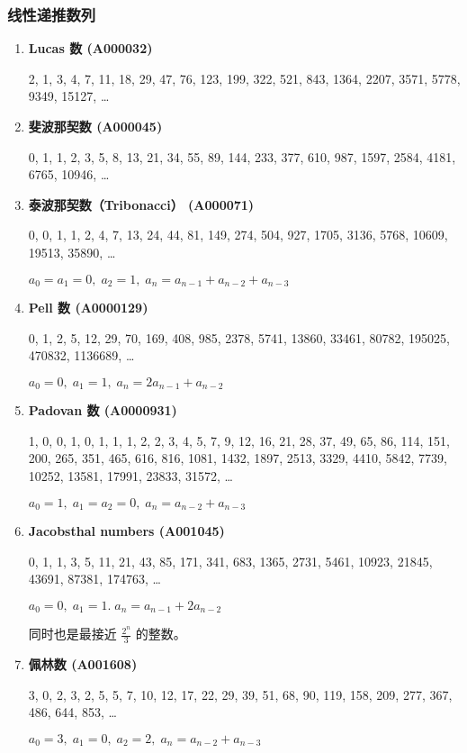 \documentclass[a4paper, twoside]{article}
\begin{document}
    \subsubsection{线性递推数列}

    \begin{enumerate}
    
        \item \textbf{Lucas 数 (A000032)}
        
        2, 1, 3, 4, 7, 11, 18, 29, 47, 76, 123, 199, 322, 521, 843, 1364, 2207, 3571, 5778, 9349, 15127, \dots
        
        \item \textbf{斐波那契数 (A000045)}
        
        0, 1, 1, 2, 3, 5, 8, 13, 21, 34, 55, 89, 144, 233, 377, 610, 987, 1597, 2584, 4181, 6765, 10946, \dots
        
        \item \textbf{泰波那契数（Tribonacci） (A000071)}
        
        0, 0, 1, 1, 2, 4, 7, 13, 24, 44, 81, 149, 274, 504, 927, 1705, 3136, 5768, 10609, 19513, 35890, \dots
        
        $ a_0 = a_1 = 0,\; a_2 = 1,\; a_n = a_{n - 1} + a_{n - 2} + a_{n - 3} $
        
        \item \textbf{Pell 数 (A0000129)}
        
        0, 1, 2, 5, 12, 29, 70, 169, 408, 985, 2378, 5741, 13860, 33461, 80782, 195025, 470832, 1136689, \dots
        
        $ a_0 = 0,\; a_1 = 1,\; a_n = 2a_{n - 1} + a_{n - 2} $
        
        \item \textbf{Padovan 数 (A0000931)}
        
        1, 0, 0, 1, 0, 1, 1, 1, 2, 2, 3, 4, 5, 7, 9, 12, 16, 21, 28, 37, 49, 65, 86, 114, 151, 200, 265, 351, 465, 616, 816, 1081, 1432, 1897, 2513, 3329, 4410, 5842, 7739, 10252, 13581,  17991,   23833, 31572, \dots
        
        $a_0 = 1,\; a_1 = a_2 = 0,\; a_n = a_{n - 2} + a_{n - 3}$
        
        \item \textbf{Jacobsthal numbers (A001045)}
        
        0, 1, 1, 3, 5, 11, 21, 43, 85, 171, 341, 683, 1365, 2731, 5461, 10923, 21845, 43691, 87381, 174763, \dots
        
        $ a_0 = 0,\; a_1 = 1.\; a_n = a_{n - 1} + 2a_{n - 2} $
        
        同时也是最接近 $\frac {2 ^ n} 3$ 的整数。
        
        \item \textbf{佩林数 (A001608)}
        
        3, 0, 2, 3, 2, 5, 5, 7, 10, 12, 17, 22, 29, 39, 51, 68, 90, 119, 158, 209, 277, 367, 486, 644, 853, \dots
        
        $ a_0 = 3,\; a_1 = 0,\; a_2 = 2,\; a_n = a_{n - 2} + a_{n - 3} $
    
    \end{enumerate}
\end{document}
